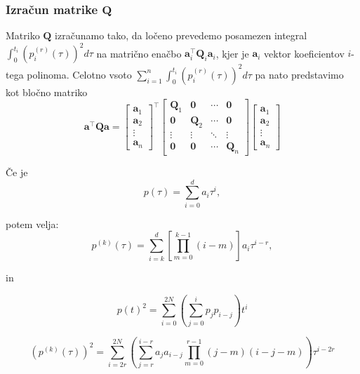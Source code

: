 \documentclass[mat2, tisk]{fmfdelo}
\begin{document}
\subsubsection{Izračun matrike $\mathbf{Q}$}
Matriko $\mathbf{Q}$ izračunamo tako, da ločeno prevedemo posamezen integral $\int_0^{t_i} (p_i^{(r)}(\tau))^2 d\tau$ na matrično enačbo $\mathbf{a}_i^\top \mathbf{Q}_i \mathbf{a}_i$, kjer je $\mathbf{a}_i$ vektor koeficientov $i$-tega polinoma. Celotno vsoto $\sum_{i=1}^n \int_0^{t_i} (p_i^{(r)}(\tau))^2 d\tau$ pa nato predstavimo kot bločno matriko
\begin{equation}
\label{eq:cost_function_matrix}
    \mathbf{a}^\top \mathbf{Q} \mathbf{a} = 
    \begin{bmatrix}
        \mathbf{a}_1 \\ \mathbf{a}_2 \\ \vdots \\ \mathbf{a}_n 
    \end{bmatrix}^\top
    \begin{bmatrix}
        \mathbf{Q}_1 & \mathbf{0} & \cdots & \mathbf{0} \\
        \mathbf{0} & \mathbf{Q}_2 & \cdots & \mathbf{0} \\
        \vdots & \vdots & \ddots & \vdots \\
        \mathbf{0} & \mathbf{0} & \cdots & \mathbf{Q}_n
    \end{bmatrix}
    \begin{bmatrix}
        \mathbf{a}_1 \\ \mathbf{a}_2 \\ \vdots \\ \mathbf{a}_n 
    \end{bmatrix}
\end{equation}

Če je 
\begin{equation}
    p(\tau) = \sum_{i = 0}^d a_{i} \tau^i,
\end{equation}

potem velja:
\begin{equation}
    p^{(k)}(\tau) = \sum_{i = k}^d [\prod_{m=0}^{k-1} (i-m)]a_{i} \tau^{i-r},
\end{equation}

in

\begin{equation}
    p(t)^2 = \sum_{i=0}^{2N} \left( \sum_{j=0}^{i} p_j p_{i-j} \right) t^i
\end{equation}

\begin{equation}
    (p^{(k)}(\tau))^2 = \sum_{i=2r}^{2N} \left( \sum_{j=r}^{i-r} a_j a_{i-j} \prod_{m=0}^{r-1} (j - m)(i - j - m) \right) \tau^{i-2r}
\end{equation}
\end{document}
